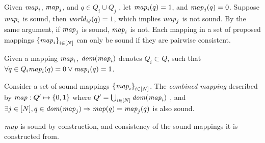 %

    Given $\mathit{map}_i$, $\mathit{map}_j$, and $q\in Q_i \cup Q_j$ , let $\mathit{map}_i(q) = 1$, and $\mathit{map}_j(q) = 0$. Suppose $\mathit{map}_i$ is sound, then $\mathit{world}_Q(q) = 1$, which implies $\mathit{map}_j$ is not sound. By the same argument, if $\mathit{map}_j$ is sound, $\mathit{map}_i$ is not. Each mapping in a set of proposed mappings $\left\{\mathit{map}_i\right\}_{i\in [N]}$ can only be sound if they are pairwise consistent.

Given a mapping $\mathit{map}_i$, $\mathit{dom}(\mathit{map}_i)$ denotes $ Q_i \subset Q$, such that $\forall q \in Q_i \mathit{map}_i(q) = 0 \vee \mathit{map}_i(q) = 1$.
\begin{definition}
    \label{cons}
Consider a set of sound mappings $\left\{\mathit{map}_i\right\}_{i\in[N]}$. The \emph{ combined mapping} described by $\mathit{map}: Q^\prime \mapsto \left\{0,1\right\}$ where $Q^\prime = \bigcup_{i\in[N]} \mathit{dom}(\mathit{map}_i)$ , and $\exists j \in [N], q\in \mathit{dom}(\mathit{map}_j)\Rightarrow \mathit{map}(q) = \mathit{map}_j(q)$ is also sound.
\end{definition}

$\mathit{map}$ is sound by construction, and consistency of the sound mappings it is constructed from.
